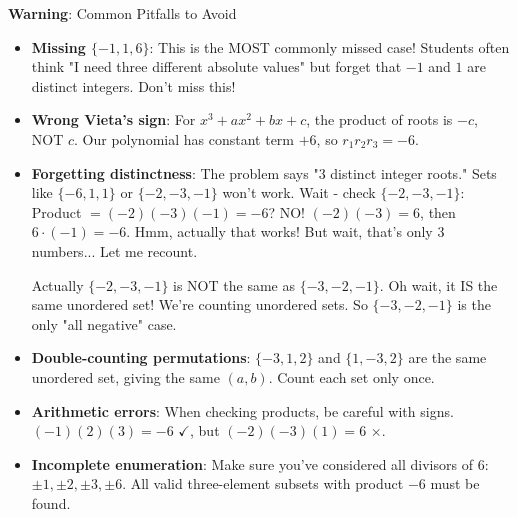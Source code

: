 \documentclass[12pt]{article}
\begin{document}
\begin{warningbox}
\textbf{Warning}: Common Pitfalls to Avoid

\begin{itemize}
    \item \textbf{Missing $\{-1, 1, 6\}$}: This is the MOST commonly missed case! Students often think "I need three different absolute values" but forget that $-1$ and $1$ are distinct integers. Don't miss this!
    
    \item \textbf{Wrong Vieta's sign}: For $x^3 + ax^2 + bx + c$, the product of roots is $-c$, NOT $c$. Our polynomial has constant term $+6$, so $r_1 r_2 r_3 = -6$.
    
    \item \textbf{Forgetting distinctness}: The problem says "3 distinct integer roots." Sets like $\{-6, 1, 1\}$ or $\{-2, -3, -1\}$ won't work. Wait - check $\{-2, -3, -1\}$: Product $= (-2)(-3)(-1) = -6$? NO! $(-2)(-3) = 6$, then $6 \cdot (-1) = -6$. Hmm, actually that works! But wait, that's only 3 numbers... Let me recount.
    
    Actually $\{-2, -3, -1\}$ is NOT the same as $\{-3, -2, -1\}$. Oh wait, it IS the same unordered set! We're counting unordered sets. So $\{-3, -2, -1\}$ is the only "all negative" case.
    
    \item \textbf{Double-counting permutations}: $\{-3, 1, 2\}$ and $\{1, -3, 2\}$ are the same unordered set, giving the same $(a,b)$. Count each set only once.
    
    \item \textbf{Arithmetic errors}: When checking products, be careful with signs. $(-1)(2)(3) = -6$ $\checkmark$, but $(- 2)(-3)(1) = 6$ $\times$.
    
    \item \textbf{Incomplete enumeration}: Make sure you've considered all divisors of 6: $\pm 1, \pm 2, \pm 3, \pm 6$. All valid three-element subsets with product $-6$ must be found.
\end{itemize}
\end{warningbox}
\end{document}
